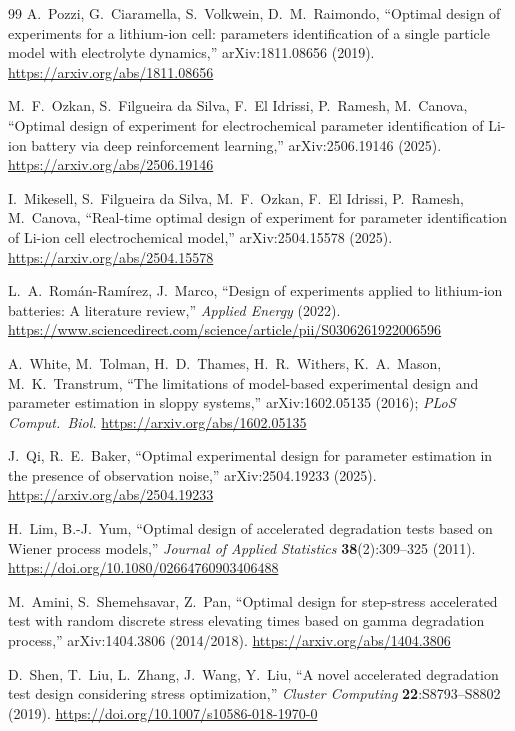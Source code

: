 \documentclass[11pt,letterpaper]{article}
\begin{document}
\begin{thebibliography}{99}
 A.~Pozzi, G.~Ciaramella, S.~Volkwein, D.~M.~Raimondo, ``Optimal design of experiments for a lithium-ion cell: parameters identification of a single particle model with electrolyte dynamics,'' arXiv:1811.08656 (2019). \url{https://arxiv.org/abs/1811.08656}

 M.~F.~Ozkan, S.~Filgueira da Silva, F.~El Idrissi, P.~Ramesh, M.~Canova, ``Optimal design of experiment for electrochemical parameter identification of Li-ion battery via deep reinforcement learning,'' arXiv:2506.19146 (2025). \url{https://arxiv.org/abs/2506.19146}

 I.~Mikesell, S.~Filgueira da Silva, M.~F.~Ozkan, F.~El Idrissi, P.~Ramesh, M.~Canova, ``Real-time optimal design of experiment for parameter identification of Li-ion cell electrochemical model,'' arXiv:2504.15578 (2025). \url{https://arxiv.org/abs/2504.15578}

 L.~A.~Rom\'an-Ram\'irez, J.~Marco, ``Design of experiments applied to lithium-ion batteries: A literature review,'' \emph{Applied Energy} (2022). \url{https://www.sciencedirect.com/science/article/pii/S0306261922006596}

 A.~White, M.~Tolman, H.~D.~Thames, H.~R.~Withers, K.~A.~Mason, M.~K.~Transtrum, ``The limitations of model-based experimental design and parameter estimation in sloppy systems,'' arXiv:1602.05135 (2016); \emph{PLoS Comput.\ Biol.} \url{https://arxiv.org/abs/1602.05135}

 J.~Qi, R.~E.~Baker, ``Optimal experimental design for parameter estimation in the presence of observation noise,'' arXiv:2504.19233 (2025). \url{https://arxiv.org/abs/2504.19233}

 H.~Lim, B.-J.~Yum, ``Optimal design of accelerated degradation tests based on Wiener process models,'' \emph{Journal of Applied Statistics} \textbf{38}(2):309--325 (2011). \url{https://doi.org/10.1080/02664760903406488}

 M.~Amini, S.~Shemehsavar, Z.~Pan, ``Optimal design for step-stress accelerated test with random discrete stress elevating times based on gamma degradation process,'' arXiv:1404.3806 (2014/2018). \url{https://arxiv.org/abs/1404.3806}

 D.~Shen, T.~Liu, L.~Zhang, J.~Wang, Y.~Liu, ``A novel accelerated degradation test design considering stress optimization,'' \emph{Cluster Computing} \textbf{22}:S8793--S8802 (2019). \url{https://doi.org/10.1007/s10586-018-1970-0}


\end{thebibliography}
\end{document}
